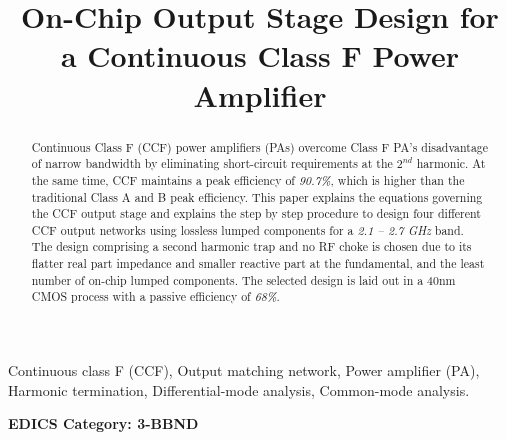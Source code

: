 \documentclass[conference]{IEEEtran}
\begin{document}
\title{On-Chip Output Stage Design for a  Continuous Class F Power Amplifier}

\author{ 
}

\maketitle

\begin{abstract}
Continuous Class F (CCF) power amplifiers (PAs) overcome Class F PA's disadvantage of narrow bandwidth by eliminating short-circuit requirements at the $2^{nd}$ harmonic. At the same time, CCF maintains a peak efficiency of \textit{90.7\%}, which is higher than the traditional Class A and B peak efficiency. This paper explains the equations governing the CCF output stage and explains the step by step procedure to design four different CCF output networks using lossless lumped components for a \textit{2.1 -- 2.7 GHz} band. The design comprising a second harmonic trap and no RF choke is chosen due to its  flatter real part impedance and smaller reactive part at the fundamental, and  the least number of on-chip lumped components. The selected design is laid out in a 40nm CMOS process with a passive efficiency of \textit{68\%}.
\end{abstract}

\vspace{1mm}
\begin{IEEEkeywords}
Continuous class F (CCF), Output matching network, Power amplifier (PA), Harmonic termination, Differential-mode analysis, Common-mode analysis. 
\end{IEEEkeywords}


\ifCLASSOPTIONpeerreview
\begin{center} \bfseries EDICS Category: 3-BBND \end{center}
\fi

\IEEEpeerreviewmaketitle
\end{document}
